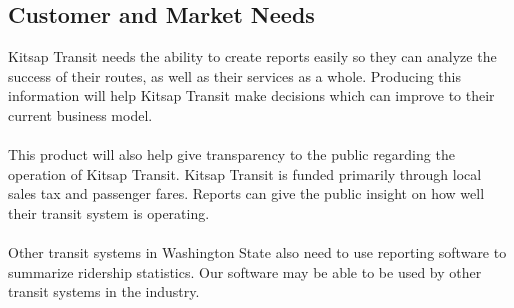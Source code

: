 \subsection{Customer and Market Needs}
Kitsap Transit needs the ability to create reports easily so they can analyze the success of their routes, as well as their services as a whole. Producing this information will help Kitsap Transit make decisions which can improve to their current business model.\\ \\
This product will also help give transparency to the public regarding the operation of Kitsap Transit. Kitsap Transit is funded primarily through local sales tax and passenger fares. Reports can give the public insight on how well their transit system is operating.\\ \\
Other transit systems in Washington State also need to use reporting software to summarize ridership statistics. Our software may be able to be used by other transit systems in the industry. 

